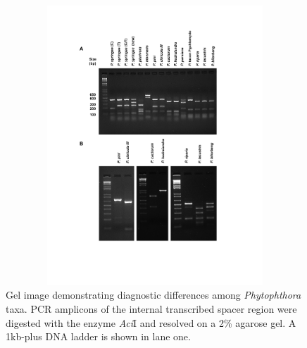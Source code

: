 \documentclass[12pt]{article}
\begin{document}
\begin{figure}[!ht]
\begin{center}
\includegraphics[trim = 0mm 110mm 0mm 0mm, clip, width=178mm, height=105mm]{Restriction_figure_v2.pdf}
\end{center}
\caption{
Gel image demonstrating diagnostic differences among \emph{Phytophthora} taxa. PCR amplicons of the internal transcribed spacer region were digested with the enzyme \emph{Aci}I and resolved on a 2\% agarose gel.  A 1kb-plus DNA ladder is shown in lane one.
}
\label{fig:gel}
\end{figure}
\clearpage
\end{document}
